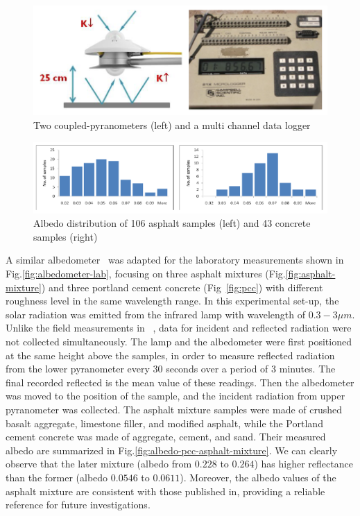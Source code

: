 \begin{figure}[!tb]
    \centering
    \includegraphics[width=0.9\linewidth]{./figures/measurement-literature/coupled-pyranometer.png}
    \caption{Two coupled-pyranometers (left) and a multi channel data logger}
    \label{fig:albedometer-logger}
\end{figure}

\begin{figure}[!tb]
    \centering
    \includegraphics[width=0.9\linewidth]{./figures/measurement-literature/albedo-asphalt-concrete.png}
    \caption{Albedo distribution of 106 asphalt samples (left) and 43 concrete samples (right)}
    \label{fig:albedo-asphalt-concrete}
\end{figure}

A similar albedometer~\cite{2019_Chen} was adapted for the laboratory measurements shown in Fig.\ref{fig:albedometer-lab}, focusing on three asphalt mixtures (Fig.\ref{fig:asphalt-mixture}) and three portland cement concrete (Fig~\ref{fig:pcc}) with different roughness level in the same wavelength range.
In this experimental set-up, the solar radiation was emitted from the infrared lamp with wavelength of $0.3-3\mu m$.
Unlike the field measurements in ~\cite{2011_KUSHARI}, data for incident and reflected radiation were not collected simultaneously.
The lamp and the albedometer were first positioned at the same height above the samples, in order to measure reflected radiation from the lower pyranometer every 30 seconds over a period of 3 minutes.
The final recorded reflected is the mean value of these readings.
Then the albedometer was moved to the position of the sample, and the incident radiation from upper pyranometer was collected.
The asphalt mixture samples were made of crushed basalt aggregate, limestone filler, and modified asphalt, while the Portland cement concrete was made of aggregate, cement, and sand.
Their measured albedo are summarized in Fig.\ref{fig:albedo-pcc-asphalt-mixture}.
We can clearly observe that the later mixture (albedo from $0.228$ to $0.264$) has higher reflectance than the former (albedo $0.0546$ to $0.0611$).
Moreover, the albedo values of the asphalt mixture are consistent with those published in\cite{1988_Blumthaler, 2011_KUSHARI}, providing a reliable reference for future investigations.

